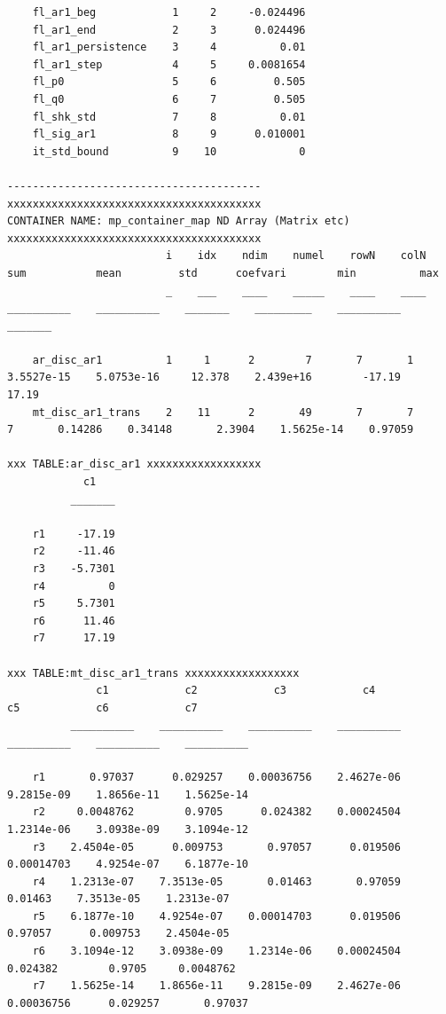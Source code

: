 \documentclass[
]{book}
\begin{document}
\begin{verbatim}
    fl_ar1_beg            1     2     -0.024496
    fl_ar1_end            2     3      0.024496
    fl_ar1_persistence    3     4          0.01
    fl_ar1_step           4     5     0.0081654
    fl_p0                 5     6         0.505
    fl_q0                 6     7         0.505
    fl_shk_std            7     8          0.01
    fl_sig_ar1            8     9      0.010001
    it_std_bound          9    10             0

----------------------------------------
xxxxxxxxxxxxxxxxxxxxxxxxxxxxxxxxxxxxxxxx
CONTAINER NAME: mp_container_map ND Array (Matrix etc)
xxxxxxxxxxxxxxxxxxxxxxxxxxxxxxxxxxxxxxxx
                         i    idx    ndim    numel    rowN    colN       sum           mean         std      coefvari        min          max  
                         _    ___    ____    _____    ____    ____    __________    __________    _______    _________    __________    _______

    ar_disc_ar1          1     1      2        7       7       1      3.5527e-15    5.0753e-16     12.378    2.439e+16        -17.19      17.19
    mt_disc_ar1_trans    2    11      2       49       7       7               7       0.14286    0.34148       2.3904    1.5625e-14    0.97059

xxx TABLE:ar_disc_ar1 xxxxxxxxxxxxxxxxxx
            c1   
          _______

    r1     -17.19
    r2     -11.46
    r3    -5.7301
    r4          0
    r5     5.7301
    r6      11.46
    r7      17.19

xxx TABLE:mt_disc_ar1_trans xxxxxxxxxxxxxxxxxx
              c1            c2            c3            c4            c5            c6            c7    
          __________    __________    __________    __________    __________    __________    __________

    r1       0.97037      0.029257    0.00036756    2.4627e-06    9.2815e-09    1.8656e-11    1.5625e-14
    r2     0.0048762        0.9705      0.024382    0.00024504    1.2314e-06    3.0938e-09    3.1094e-12
    r3    2.4504e-05      0.009753       0.97057      0.019506    0.00014703    4.9254e-07    6.1877e-10
    r4    1.2313e-07    7.3513e-05       0.01463       0.97059       0.01463    7.3513e-05    1.2313e-07
    r5    6.1877e-10    4.9254e-07    0.00014703      0.019506       0.97057      0.009753    2.4504e-05
    r6    3.1094e-12    3.0938e-09    1.2314e-06    0.00024504      0.024382        0.9705     0.0048762
    r7    1.5625e-14    1.8656e-11    9.2815e-09    2.4627e-06    0.00036756      0.029257       0.97037


\end{verbatim}
\end{document}
